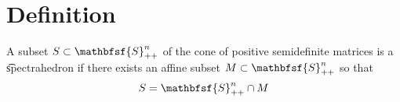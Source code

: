 
\section*{Definition}

A subset $S \subset \mathbfsf{S} _{++}^n$ of the cone of positive semidefinite matrices is a \t{spectrahedron} if there exists an affine subset $M \subset \mathbfsf{S} _{++}^n$ so that
\[
S = \mathbfsf{S} _{++}^n \cap  M
\]

\blankpage